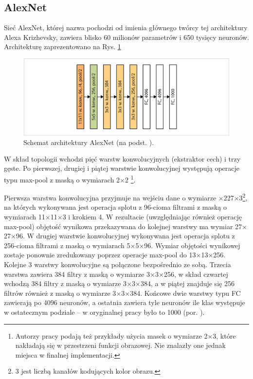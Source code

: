 \subsection{AlexNet}
\label{AlexNet}
Sieć AlexNet, której nazwa pochodzi od imienia głównego twórcy tej architektury Alexa Krizhevsky, zawiera blisko 60 milionów parametrów i 650 tysięcy neuronów. Architekturę zaprezentowano na Rys. \ref{AlexNetTopology}
\begin{figure}[h!]
	\centering
	\includegraphics[width=1\textwidth]{figures/AlexNet.png}
	\caption{Schemat architektury AlexNet (na podst. \cite{Krizhevsky2012}).}
	\label{AlexNetTopology}
\end{figure}

W skład topologii wchodzi pięć warstw konwolucyjnych (ekstraktor cech) i trzy gęste. Po pierwszej, drugiej i piątej warstwie konwolucyjnej występują operacje typu max-pool z maską o wymiarach 2$\times$2 \footnote{Autorzy pracy podają też przykłady użycia masek o wymiarze 2$\times$3, które nakładają się \linebreak w przestrzeni funkcji obrazowej. Nie znalazły one jednak miejsca w finalnej implementacji.}. 

Pierwsza warstwa konwolucyjna przyjmuje na wejściu dane o wymiarze $\times$227$\times$3\footnote{3 jest liczbą kanałów kodujących kolor obrazu.}, na których wykonywana jest operacja splotu z 96-cioma filtrami \linebreak z maską o wymiarach 11$\times$11$\times$3 i krokiem 4. W rezultacie (uwzględniając również operację max-pool) objętość wynikowa przekazywana do kolejnej warstwy ma wymiar 27$\times$27$\times$96. W drugiej warstwie konwolucyjnej wykonywana jest operacja splotu z 256-cioma filtrami z maską o wymiarach 5$\times$5$\times$96. Wymiar objętości wynikowej zostaje ponownie zredukowany poprzez operacje max-pool do 13$\times$13$\times$256. Kolejne 3 warstwy konwolucyjne są połączone bezpośrednio ze sobą. Trzecia warstwa zawiera 384 filtry z maską o wymiarze 3$\times$3$\times$256, w skład czwartej wchodzą 384 filtry \linebreak z maską o wymiarze 3$\times$3$\times$384, a w piątej znajduje się 256 filtrów również z maską \linebreak o wymiarze 3$\times$3$\times$384. Końcowe dwie warstwy typu FC zawierają po 4096 neuronów, a ostatnia zawiera tyle neuronów ile klas występuje w ostatecznym podziale -- w oryginalnej pracy było to 1000 (por. \cite{Krizhevsky2012}).

